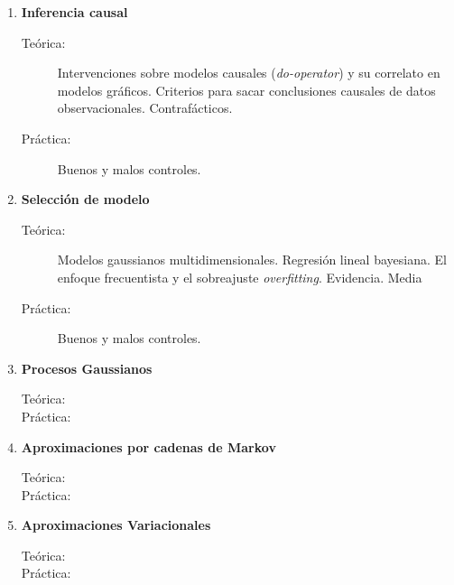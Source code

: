 \documentclass[10pt]{article}
\begin{document}
\begin{enumerate}

\vspace{0.1cm}
\item \textbf{Inferencia causal}
\vspace{-0.15cm}
\begin{description}
\item[Teórica:] Intervenciones sobre modelos causales (\emph{do-operator}) y su correlato en modelos gráficos. Criterios para sacar conclusiones causales de datos observacionales. Contrafácticos. 
\item[Práctica:] Buenos y malos controles.
\end{description}


\vspace{0.1cm}
\item \textbf{Selección de modelo}
\vspace{-0.15cm}
\begin{description}
\item[Teórica:] Modelos gaussianos multidimensionales. Regresión lineal bayesiana. El enfoque frecuentista y el sobreajuste \emph{overfitting}. Evidencia. Media 
\item[Práctica:] Buenos y malos controles.
\end{description}


\vspace{0.1cm}
\item \textbf{Procesos Gaussianos}
\vspace{-0.15cm}
\begin{description}
\item[Teórica:]
\item[Práctica:]
\end{description}


\vspace{0.1cm}
\item \textbf{Aproximaciones por cadenas de Markov}
\vspace{-0.15cm}
\begin{description}
\item[Teórica:]
\item[Práctica:]
\end{description}


\vspace{0.1cm}
\item \textbf{Aproximaciones Variacionales}
\vspace{-0.15cm}
\begin{description}
\item[Teórica:]
\item[Práctica:]
\end{description}


\end{enumerate}
\end{document}
